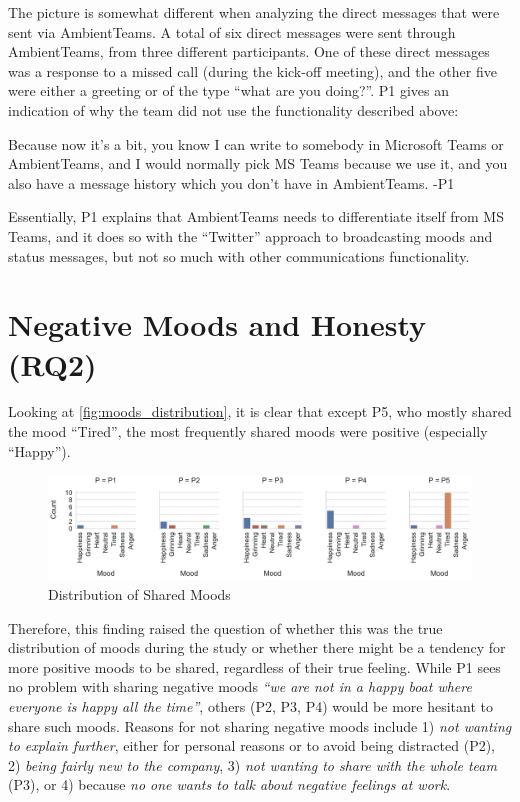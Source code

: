The picture is somewhat different when analyzing the direct messages that were sent via AmbientTeams. A total of six direct messages were sent through AmbientTeams, from three different participants. One of these direct messages was a response to a missed call (during the kick-off meeting), and the other five were either a greeting or of the type \enquote{what are you doing?}. P1 gives an indication of why the team did not use the functionality described above:

\begin{displayquote}
    Because now it's a bit, you know I can write to somebody in Microsoft Teams or AmbientTeams, and I would normally pick MS Teams because we use it, and you also have a message history which you don't have in AmbientTeams. -P1
\end{displayquote}

Essentially, P1 explains that AmbientTeams needs to differentiate itself from MS Teams, and it does so with the \enquote{Twitter} approach to broadcasting moods and status messages, but not so much with other communications functionality.

\section{Negative Moods and Honesty (RQ2)}
\label{section:negative_moods_and_honesty}

Looking at \autoref{fig:moods_distribution}, it is clear that except P5, who mostly shared the mood \enquote{Tired}, the most frequently shared moods were positive (especially \enquote{Happy}).

\begin{figure}[h]
    \centering
    \includegraphics[width=\linewidth]{plots/moods_distribution.pdf}
    \caption{Distribution of Shared Moods}
    \label{fig:moods_distribution}
\end{figure}

Therefore, this finding raised the question of whether this was the true distribution of moods during the study or whether there might be a tendency for more positive moods to be shared, regardless of their true feeling. While P1 sees no problem with sharing negative moods \textit{\enquote{we are not in a happy boat where everyone is happy all the time}}, others (P2, P3, P4) would be more hesitant to share such moods. Reasons for not sharing negative moods include 1) \textit{not wanting to explain further}, either for personal reasons or to avoid being distracted (P2), 2) \textit{being fairly new to the company}, 3) \textit{not wanting to share with the whole team} (P3), or 4) because \textit{no one wants to talk about negative feelings at work}.

